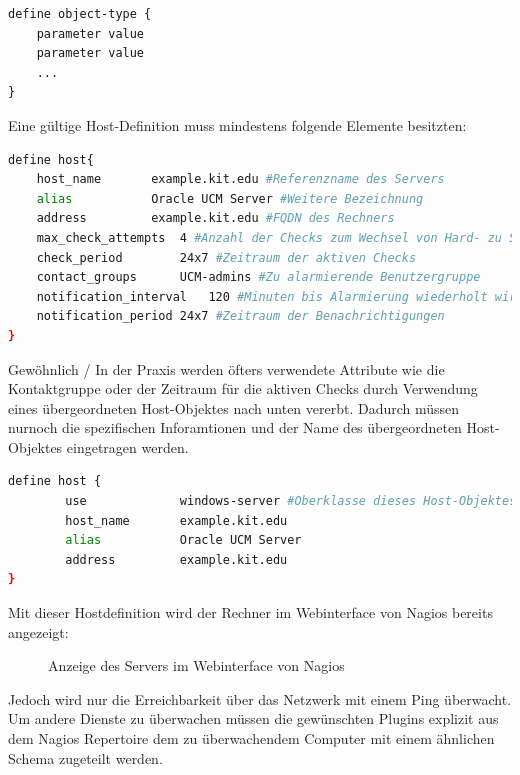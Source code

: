\begin{lstlisting}[captionpos=b, caption=Nagiosschema für Objektdefinitionen, label=schmeaobj, breaklines = false]
define object-type {
	parameter value
	parameter value
	...
}
\end{lstlisting}


Eine gültige Host-Definition muss mindestens folgende Elemente besitzten:

\begin{lstlisting}[captionpos=b, caption=Definition eines Hostobjektes, label=hostobj, breaklines = true, language=sh]
define host{
	host_name		example.kit.edu #Referenzname des Servers
	alias			Oracle UCM Server #Weitere Bezeichnung
	address			example.kit.edu #FQDN des Rechners
	max_check_attempts	4 #Anzahl der Checks zum Wechsel von Hard- zu Soft-State
	check_period		24x7 #Zeitraum der aktiven Checks
	contact_groups		UCM-admins #Zu alarmierende Benutzergruppe
	notification_interval	120 #Minuten bis Alarmierung wiederholt wird
	notification_period	24x7 #Zeitraum der Benachrichtigungen
}
\end{lstlisting}

Gewöhnlich / In der Praxis werden öfters verwendete Attribute wie die Kontaktgruppe oder der Zeitraum für die aktiven Checks durch Verwendung eines übergeordneten Host-Objektes nach unten vererbt.
Dadurch müssen nurnoch die spezifischen Inforamtionen und der Name des übergeordneten Host-Objektes eingetragen werden.
\begin{lstlisting}[captionpos=b, caption=Verkürzte Definition eines Hostobjektes, label=vhostobj, breaklines = true, language=sh]
define host {
        use             windows-server #Oberklasse dieses Host-Objektes
        host_name       example.kit.edu
        alias           Oracle UCM Server
        address         example.kit.edu
}
\end{lstlisting}

Mit dieser Hostdefinition wird der Rechner im Webinterface von Nagios bereits angezeigt:

\begin{figure}[ht]
	\centering
		\caption{Anzeige des Servers im Webinterface von Nagios}
		\label{check-swap}
\end{figure}

Jedoch wird nur die Erreichbarkeit über das Netzwerk mit einem Ping überwacht.
Um andere Dienste zu überwachen müssen die gewünschten Plugins explizit aus dem Nagios Repertoire dem zu überwachendem Computer mit einem ähnlichen Schema zugeteilt werden.

